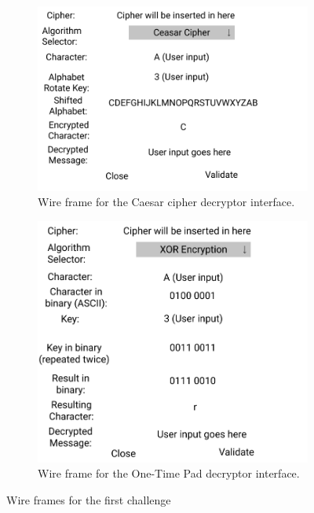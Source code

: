 \documentclass{l4proj}
\begin{document}
\begin{figure}
    \centering
    \begin{subfigure}[b]{0.5\textwidth}
        \includegraphics[width=\textwidth, frame]{images/CaesarCipher.png}
        \caption{Wire frame for the Caesar cipher decryptor interface.}
        \label{fig:Caesar}
    \end{subfigure}

    \begin{subfigure}[b]{0.5\textwidth}
        \includegraphics[width=\textwidth, frame]{images/xOR.png}
        \caption{Wire frame for the One-Time Pad decryptor interface.}
        \label{fig:xOR}
    \end{subfigure}
    
    \caption{Wire frames for the first challenge}
    \label{fig:Challenge1}

\end{figure}
\end{document}
